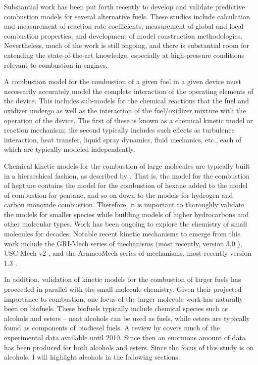 \documentclass[../main.tex]{subfiles}
\begin{document}
Substantial work has been put forth recently to develop and validate predictive
combustion models for several alternative fuels. These studies include
calculation and measurement of reaction rate coefficients, measurement of
global and local combustion properties, and development of model construction
methodologies. Nevertheless, much of the work is still ongoing, and there is
substantial room for extending the state-of-the-art knowledge, especially at
high-pressure conditions relevant to combustion in engines.

A combustion model for the combustion of a given fuel in a given device
must necessarily accurately model the complete interaction of the operating
elements of the device. This includes sub-models for the chemical reactions that the
fuel and oxidizer undergo as well as the interaction of the fuel/oxidizer
mixture with the operation of the device. The first of these is known as
a chemical kinetic model or reaction mechanism; the second typically includes
such effects as turbulence interaction, heat transfer, liquid spray
dynamics, fluid mechanics, etc., each of which are typically modeled independently.

Chemical kinetic models for the combustion of large molecules are typically
built in a hierarchical fashion, as described by \textcite{Westbrook1984}. That
is, the model for the combustion of heptane contains the model for the
combustion of hexane added to the model of combustion for pentane, and so on
down to the models for hydrogen and carbon monoxide combustion. Therefore, it
is important to thoroughly validate the models for smaller species while
building models of higher hydrocarbons and other molecular types. Work has been
ongoing to explore the chemistry of small molecules for decades. Notable recent
kinetic mechanisms to emerge from this work include the GRI-Mech series of
mechanisms (most recently, version 3.0 \cite{Smith}), USC-Mech v2
\cite{Wang2007}, and the AramcoMech series of mechanisms, most recently version
1.3 \cite{Metcalfe2013}.

In addition, validation of kinetic models for the combustion of larger fuels
has proceeded in parallel with the small molecule chemistry. Given their projected
importance to combustion, one focus of the larger molecule work has naturally
been on biofuels. These biofuels typically include chemical species such as
alcohols and esters – neat alcohols can be used as fuels, while esters are
typically found as components of biodiesel fuels. A review by \textcite{Kohse-Hoinghaus2010}
covers much of the experimental data available until 2010. Since then an
enormous amount of data has been produced for both alcohols and esters.
Since the focus of this study is on alcohols, I will highlight alcohols
in the following sections.
\end{document}
